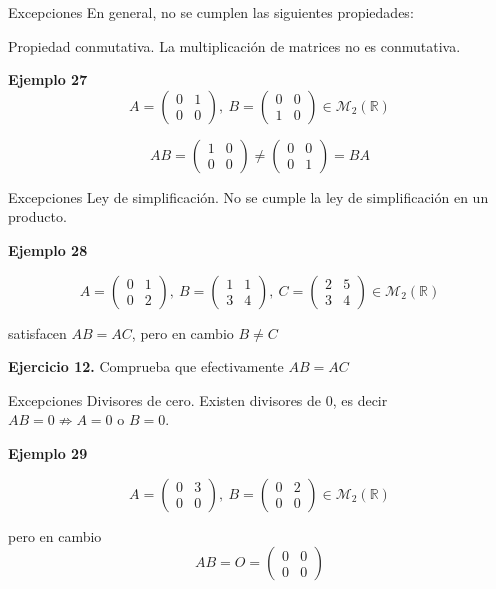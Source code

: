 \documentclass[
  ignorenonframetext,
]{beamer}
\begin{document}
\begin{frame}{Excepciones}
\protect\hypertarget{excepciones}{}
En general, no se cumplen las siguientes propiedades:

Propiedad conmutativa. La multiplicación de matrices no es conmutativa.

\textbf{Ejemplo 27}
\[A = \begin{pmatrix}0&1\\0&0\end{pmatrix},\ B=\begin{pmatrix}0&0\\1&0\end{pmatrix}\in\mathcal{M}_2(\mathbb{R})\]

\[AB = \begin{pmatrix}1&0\\0&0\end{pmatrix}\ne\begin{pmatrix}0&0\\0&1\end{pmatrix}=BA\]
\end{frame}

\begin{frame}{Excepciones}
\protect\hypertarget{excepciones-1}{}
Ley de simplificación. No se cumple la ley de simplificación en un
producto.

\textbf{Ejemplo 28}

\[A = \begin{pmatrix}0&1\\0&2\end{pmatrix},\ B=\begin{pmatrix}1&1\\3&4\end{pmatrix},\ C=\begin{pmatrix}2&5\\3&4\end{pmatrix}\in\mathcal{M}_2(\mathbb{R})\]

satisfacen \(AB=AC\), pero en cambio \(B\ne C\)

\textbf{Ejercicio 12.} Comprueba que efectivamente \(AB=AC\)
\end{frame}

\begin{frame}{Excepciones}
\protect\hypertarget{excepciones-2}{}
Divisores de cero. Existen divisores de 0, es decir
\(AB=0\not\Rightarrow A=0\text{ o }B=0\).

\textbf{Ejemplo 29}

\[A = \begin{pmatrix}0&3\\0&0\end{pmatrix},\ B=\begin{pmatrix}0&2\\0&0\end{pmatrix}\in\mathcal{M}_2(\mathbb{R})\]

pero en cambio \[AB=O=\begin{pmatrix}0&0\\0&0\end{pmatrix}\]
\end{frame}
\end{document}
